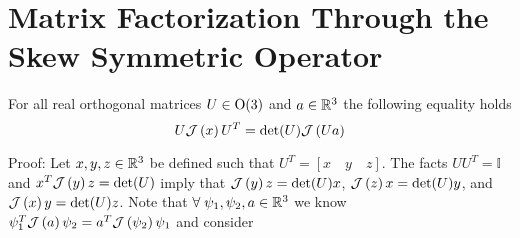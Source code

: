 \section{Matrix Factorization Through the \\Skew
  Symmetric Operator}
%
\label{chModels.sec.genMat_Factorization}


\begin{realOrth_Factorization}
\label{chModels.theo.realOrth_Factorization}
For all real orthogonal matrices  $U\in\O3$ and $a\in\mathbb{R}^{3}$ the
following equality holds
%
\begin{equation}
\label{chModels.eq.realOrth_Factorization}
U\mathcal{J}\left( x \right)U^T=\det(U)\mathcal{J}\left( Ua \right)
\end{equation}
%
\end{realOrth_Factorization}
%
\noindent Proof: Let $x,y,z\in\mathbb{R}^{3}$ be defined such that
%
$U^T=\left[x \quad y \quad z \right]$.
%
The facts $UU^T=\mathbb{I}$ and $x^T\mathcal{J}\left( y \right)z=\det(U)$
imply that $\mathcal{J}\left( y \right)z=\det(U)x$,
$\mathcal{J}\left( z \right)x=\det(U)y$, and $\mathcal{J}\left( x \right)y=\det(U)z$.
%
Note that $\forall\;\psi_1,\psi_2,a\in\mathbb{R}^{3}$ we know
$\psi_1^T\mathcal{J}\left( a \right)\psi_2=a^T\mathcal{J}\left( \psi_2 \right)\psi_1$ and consider
%
